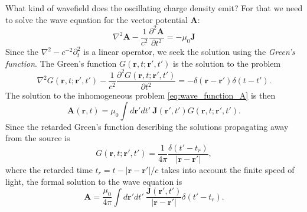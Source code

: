 What kind of wavefield does the oscillating charge density emit? For that we need to solve the 
wave equation for the vector potential $\mathbf{A}$:
\begin{equation}\label{eq:wave_function_A}
\nabla^2 \mathbf{A} - \frac{1}{c^2}\frac{\partial^2 \mathbf{A}}{\partial t^2} = -\mu_0 \mathbf{J}
\end{equation}
Since the $\nabla^2 - c^{-2} \partial^2_t$ is a linear operator, we seek the solution using the \emph{Green's function}. The Green's function $G(\mathbf{r},t;\mathbf{r}',t')$ is the solution to the problem 
\begin{equation}
\nabla^2  G(\mathbf{r},t;\mathbf{r}',t') - \frac{1}{c^2}\frac{\partial^2 G(\mathbf{r},t;\mathbf{r}',t')}{\partial t^2} = - \delta(\mathbf{r}-\mathbf{r}')
\delta(t-t').
\end{equation}
The solution to the inhomogeneous problem \eqref{eq:wave_function_A} is then
\begin{equation}
\mathbf{A}(\mathbf{r},t) = \mu_0 \int d\mathbf{r}' dt' \   \mathbf{J}(\mathbf{r}',t') G(\mathbf{r},t;\mathbf{r}',t').
\end{equation}
Since the retarded Green's function describing the solutions propagating away from the source is 
\begin{equation}
G(\mathbf{r},t;\mathbf{r}',t') = \frac{1}{4 \pi} \frac{\delta(t'-t_r)}{|\mathbf{r}-\mathbf{r}'|},
\end{equation}
where the retarded time $t_r = t - |\mathbf{r}-\mathbf{r}'|/c$ takes into account the finite speed of light, 
the formal solution to the wave equation is 
\begin{equation}
\mathbf{A} = \frac{\mu_0}{4 \pi}\int d\mathbf{r}' dt' \  \frac{\mathbf{J}(\mathbf{r}',t')}{|\mathbf{r}-\mathbf{r}'|} \delta(t'-t_r).\label{eq:oscillating_A}
\end{equation}
